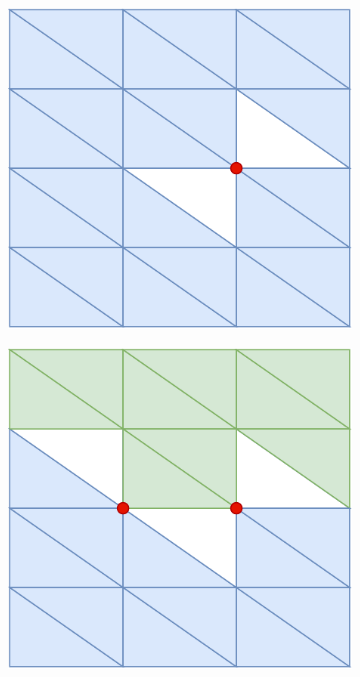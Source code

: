 \begin{figure}[H]
\begin{subfigure}{.24\linewidth}
    \caption{\label{fig:ch3_NonMainifoldCond1B}}\vspace{6pt}
  \end{subfigure}
  \begin{subfigure}{.24\linewidth}
    \centering\includegraphics[width=.9\linewidth]{chapter_3_polylidar3d/imgs/OPCHalfEdge-ManifoldMeshC.pdf}
    \caption{\label{fig:ch3_NonMainifoldCond1C}}\vspace{6pt}
  \end{subfigure}
  \begin{subfigure}{.24\linewidth}
    \centering\includegraphics[width=.9\linewidth]{chapter_3_polylidar3d/imgs/OPCHalfEdge-ManifoldMeshD.pdf}

\end{subfigure}
\end{figure}
